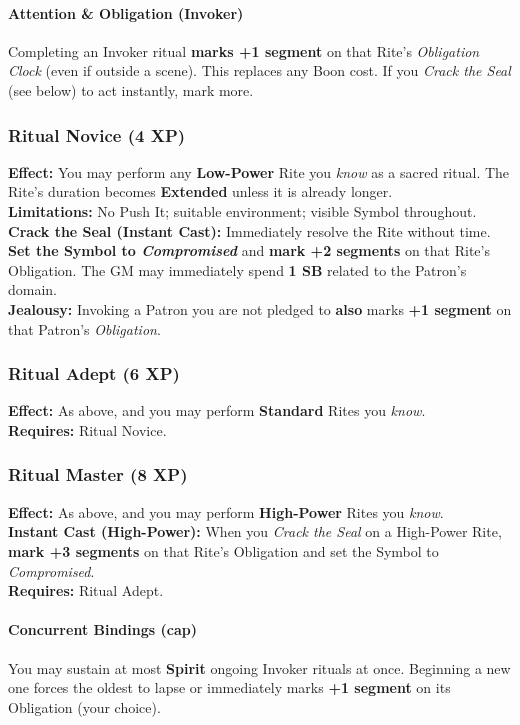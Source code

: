 \documentclass[12pt,twoside]{book}
\begin{document}
\paragraph{Attention \& Obligation (Invoker)}
Completing an Invoker ritual \textbf{marks +1 segment} on that Rite's \emph{Obligation Clock} (even if outside a scene). This replaces any Boon cost. If you \emph{Crack the Seal} (see below) to act instantly, mark more.

\subsubsection*{Ritual Novice (4 XP)}
\textbf{Effect:} You may perform any \textbf{Low-Power} Rite you \emph{know} as a sacred ritual. The Rite's duration becomes \textbf{Extended} unless it is already longer.\\
\textbf{Limitations:} No Push It; suitable environment; visible Symbol throughout.\\
\textbf{Crack the Seal (Instant Cast):} Immediately resolve the Rite without time. \textbf{Set the Symbol to \emph{Compromised}} and \textbf{mark +2 segments} on that Rite's Obligation. The GM may immediately spend \textbf{1 SB} related to the Patron's domain.\\
\textbf{Jealousy:} Invoking a Patron you are not pledged to \textbf{also} marks \textbf{+1 segment} on that Patron's \emph{Obligation}.

\subsubsection*{Ritual Adept (6 XP)} 
\textbf{Effect:} As above, and you may perform \textbf{Standard} Rites you \emph{know}.\\
\textbf{Requires:} Ritual Novice.

\subsubsection*{Ritual Master (8 XP)} 
\textbf{Effect:} As above, and you may perform \textbf{High-Power} Rites you \emph{know}.\\
\textbf{Instant Cast (High-Power):} When you \emph{Crack the Seal} on a High-Power Rite, \textbf{mark +3 segments} on that Rite's Obligation and set the Symbol to \emph{Compromised}.\\
\textbf{Requires:} Ritual Adept.

\paragraph{Concurrent Bindings (cap)}
You may sustain at most \textbf{Spirit} ongoing Invoker rituals at once. Beginning a new one forces the oldest to lapse or immediately marks \textbf{+1 segment} on its Obligation (your choice).
\end{document}

